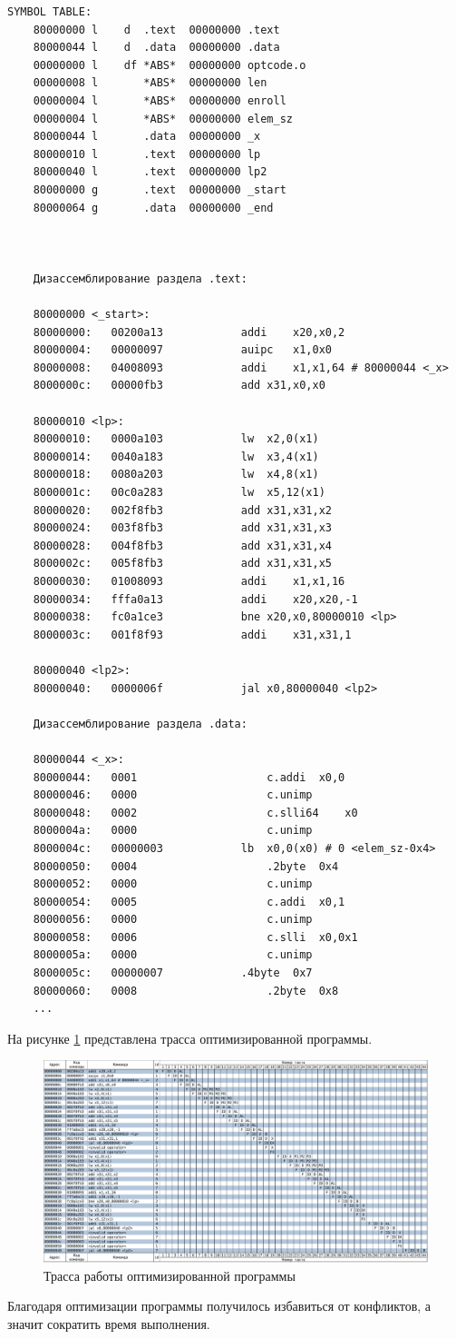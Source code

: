 \begin{lstlisting}[label=lst:opthex,caption=Дизассемблированная оптимизированная программа]
	SYMBOL TABLE:
	80000000 l    d  .text	00000000 .text
	80000044 l    d  .data	00000000 .data
	00000000 l    df *ABS*	00000000 optcode.o
	00000008 l       *ABS*	00000000 len
	00000004 l       *ABS*	00000000 enroll
	00000004 l       *ABS*	00000000 elem_sz
	80000044 l       .data	00000000 _x
	80000010 l       .text	00000000 lp
	80000040 l       .text	00000000 lp2
	80000000 g       .text	00000000 _start
	80000064 g       .data	00000000 _end
	
	
	
	Дизассемблирование раздела .text:
	
	80000000 <_start>:
	80000000:	00200a13          	addi	x20,x0,2
	80000004:	00000097          	auipc	x1,0x0
	80000008:	04008093          	addi	x1,x1,64 # 80000044 <_x>
	8000000c:	00000fb3          	add	x31,x0,x0
	
	80000010 <lp>:
	80000010:	0000a103          	lw	x2,0(x1)
	80000014:	0040a183          	lw	x3,4(x1)
	80000018:	0080a203          	lw	x4,8(x1)
	8000001c:	00c0a283          	lw	x5,12(x1)
	80000020:	002f8fb3          	add	x31,x31,x2
	80000024:	003f8fb3          	add	x31,x31,x3
	80000028:	004f8fb3          	add	x31,x31,x4
	8000002c:	005f8fb3          	add	x31,x31,x5
	80000030:	01008093          	addi	x1,x1,16
	80000034:	fffa0a13          	addi	x20,x20,-1
	80000038:	fc0a1ce3          	bne	x20,x0,80000010 <lp>
	8000003c:	001f8f93          	addi	x31,x31,1
	
	80000040 <lp2>:
	80000040:	0000006f          	jal	x0,80000040 <lp2>
	
	Дизассемблирование раздела .data:
	
	80000044 <_x>:
	80000044:	0001                	c.addi	x0,0
	80000046:	0000                	c.unimp
	80000048:	0002                	c.slli64	x0
	8000004a:	0000                	c.unimp
	8000004c:	00000003          	lb	x0,0(x0) # 0 <elem_sz-0x4>
	80000050:	0004                	.2byte	0x4
	80000052:	0000                	c.unimp
	80000054:	0005                	c.addi	x0,1
	80000056:	0000                	c.unimp
	80000058:	0006                	c.slli	x0,0x1
	8000005a:	0000                	c.unimp
	8000005c:	00000007          	.4byte	0x7
	80000060:	0008                	.2byte	0x8
	...
\end{lstlisting}

На рисунке \ref{trace2} представлена трасса оптимизированной программы.

\begin{figure}[h!p]
	\centering
	\includegraphics[width = \linewidth]{../img/trace2.pdf}
	\caption{Трасса работы оптимизированной программы}
	\label{trace2}
\end{figure}

Благодаря оптимизации программы получилось избавиться от конфликтов, а значит сократить время выполнения.
